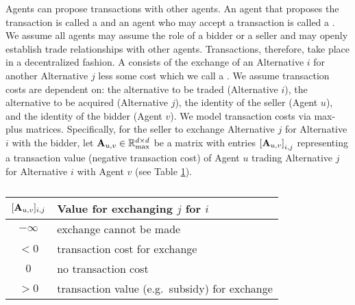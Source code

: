 \documentclass[letterpaper, 10 pt, conference]{ieeeconf}
\begin{document}
Agents can propose transactions with other agents. An agent that proposes the transaction is called a  and an agent who may accept a transaction is called a .  We assume all agents may assume the role of a bidder or a seller and may openly establish trade relationships with other agents. Transactions, therefore, take place in a decentralized fashion. A  consists of the exchange of an Alternative $i$ for another Alternative $j$ less some cost which we call a . We assume transaction costs are dependent on: the alternative to be traded (Alternative $i$), the alternative to be acquired (Alternative $j$), the identity of the seller (Agent $u$), and the identity of the bidder (Agent $v$). We model transaction costs via max-plus matrices. Specifically, for the seller to exchange Alternative $j$ for Alternative $i$ with the bidder, let $\mathbf{A}_{u,v} \in \mathbb{R}_{\mathrm{max}}^{d \times d}$ be a matrix with entries $\left[ \mathbf{A}_{u,v} \right]_{i,j}$ representing a transaction value (negative transaction cost) of Agent $u$ trading Alternative $j$ for Alternative $i$ with Agent $v$ (see Table \ref{table:transaction-costs}).

\begin{table}
\centering
\begin{tabular}{cl}
\toprule
$[\mathbf{A}_{u,v}]_{i,j}$ & Value for exchanging $j$ for $i$ \\
\midrule
$-\infty$ & exchange cannot be made \\
$< 0$ & transaction cost for exchange \\
$0$ & no transaction cost \\
$> 0$ & transaction value (e.g.~subsidy) for exchange \\
\bottomrule
\end{tabular}
\caption{}
\label{table:transaction-costs}
\end{table}
\end{document}
